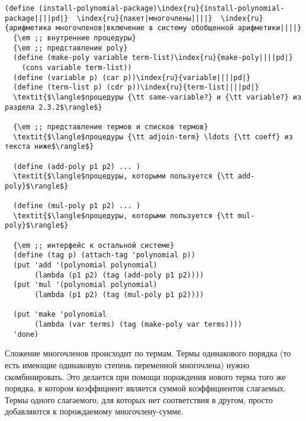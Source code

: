 \begin{Verbatim}[fontsize=\small]
(define (install-polynomial-package)\index{ru}{install-polynomial-package||||pd|}  \index{ru}{пакет|многочлены||||}  \index{ru}{арифметика многочленов|включение в систему обобщенной арифметики||||}
  {\em ;; внутренние процедуры}
  {\em ;; представление poly}
  (define (make-poly variable term-list)\index{ru}{make-poly||||pd|} 
    (cons variable term-list))
  (define (variable p) (car p))\index{ru}{variable||||pd|}
  (define (term-list p) (cdr p))\index{ru}{term-list||||pd|}
  \textit{$\langle$процедуры {\tt same-variable?} и {\tt variable?} из раздела 2.3.2$\rangle$}

  {\em ;; представление термов и списков термов}
  \textit{$\langle$процедуры {\tt adjoin-term} \ldots {\tt coeff} из текста ниже$\rangle$}

  (define (add-poly p1 p2) ... )
  \textit{$\langle$процедуры, которыми пользуется {\tt add-poly}$\rangle$}

  (define (mul-poly p1 p2) ... )
  \textit{$\langle$процедуры, которыми пользуется {\tt mul-poly}$\rangle$}

  {\em ;; интерфейс к остальной системе}
  (define (tag p) (attach-tag 'polynomial p))
  (put 'add '(polynomial polynomial) 
       (lambda (p1 p2) (tag (add-poly p1 p2))))
  (put 'mul '(polynomial polynomial) 
       (lambda (p1 p2) (tag (mul-poly p1 p2))))

  (put 'make 'polynomial
       (lambda (var terms) (tag (make-poly var terms))))
  'done)
\end{Verbatim}

Сложение многочленов происходит по термам.  Термы
одинакового порядка (то есть имеющие одинаковую степень переменной
многочлена) нужно скомбинировать.  Это делается при помощи порождения
нового терма того же порядка, в котором коэффициент является суммой
коэффициентов слагаемых.  Термы одного слагаемого, для которых нет
соответствия в другом, просто добавляются к порождаемому
многочлену-сумме.

